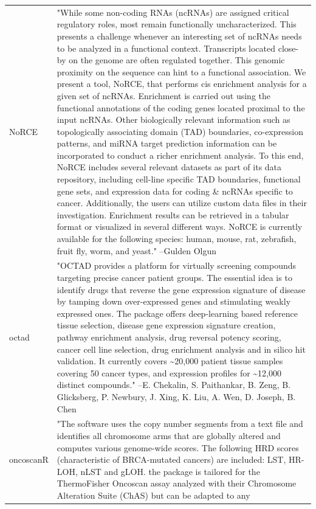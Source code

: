 \documentclass[]{article}
\begin{document}
\begin{longtable}[t]{l>{\raggedright\arraybackslash}p{25em}}
NoRCE & "While some non-coding RNAs (ncRNAs) are assigned critical
regulatory roles, most remain functionally uncharacterized.
This presents a challenge whenever an interesting set of ncRNAs
needs to be analyzed in a functional context. Transcripts
located close-by on the genome are often regulated together.
This genomic proximity on the sequence can hint to a functional
association. We present a tool, NoRCE, that performs cis
enrichment analysis for a given set of ncRNAs. Enrichment is
carried out using the functional annotations of the coding
genes located proximal to the input ncRNAs. Other biologically
relevant information such as topologically associating domain
(TAD) boundaries, co-expression patterns, and miRNA target
prediction information can be incorporated to conduct a richer
enrichment analysis. To this end, NoRCE includes several
relevant datasets as part of its data repository, including
cell-line specific TAD boundaries, functional gene sets, and
expression data for coding \& ncRNAs specific to cancer.
Additionally, the users can utilize custom data files in their
investigation. Enrichment results can be retrieved in a tabular
format or visualized in several different ways. NoRCE is
currently available for the following species: human, mouse,
rat, zebrafish, fruit fly, worm, and yeast." --Gulden Olgun\\
octad & "OCTAD provides a platform for virtually screening
compounds targeting precise cancer patient groups. The
essential idea is to identify drugs that reverse the gene
expression signature of disease by tamping down over-expressed
genes and stimulating weakly expressed ones. The package offers
deep-learning based reference tissue selection, disease gene
expression signature creation, pathway enrichment analysis,
drug reversal potency scoring, cancer cell line selection, drug
enrichment analysis and in silico hit validation. It currently
covers \textasciitilde{}20,000 patient tissue samples covering 50 cancer types,
and expression profiles for \textasciitilde{}12,000 distinct compounds." --E. Chekalin, S. Paithankar, B. Zeng, B. Glicksberg, P. Newbury, J. Xing, K. Liu, A. Wen, D. Joseph, B. Chen\\
oncoscanR & "The software uses the copy number segments from a text
file and identifies all chromosome arms that are globally
altered and computes various genome-wide scores. The following
HRD scores (characteristic of BRCA-mutated cancers) are
included: LST, HR-LOH, nLST and gLOH. the package is tailored
for the ThermoFisher Oncoscan assay analyzed with their
Chromosome Alteration Suite (ChAS) but can be adapted to any

\end{longtable}
\end{document}
